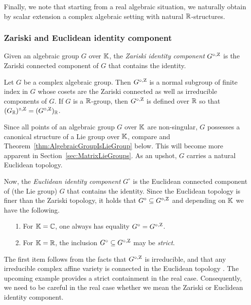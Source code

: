 
Finally, we note that starting from a real algebraic situation, we naturally obtain by scalar extension a complex algebraic setting with natural $\mathbb R$-structures. 



\subsubsection{Zariski and Euclidean identity component}


Given an algebraic group $G$ over $\mathbb K$, the \emph{Zariski identity component} $G^{\circ, \operatorname{Z}}$ is the Zariski connected component of $G$ that contains the identity. 

\begin{prop}
	Let $G$ be a complex algebraic group. Then $G^{\circ, \operatorname{Z}}$ is a normal subgroup of finite index in $G$ whose cosets are the Zariski connected as well as irreducible components of $G$.
	If $G$ is a $\mathbb R$-group, then $G^{\circ, \operatorname{Z}}$ is defined over $\mathbb R$ so that $(G_{\mathbb R})^{\circ, \operatorname{Z}} = (G^{\circ,\operatorname{Z}})_\mathbb R$.
\end{prop}

Since all points of an algebraic group $G$ over $\mathbb K$ are non-singular, $G$ possesses a canonical structure of a Lie group over $\mathbb K$, compare \cite[Sections~3.1.2 and ~2.3.4]{OnishchikVinbergBook} and Theorem~\ref{thm:AlgebraicGroupIsLieGroup} below.
This will become more apparent in Section~\ref{sec:MatrixLieGroups}. As an upshot, $G$ carries a natural Euclidean topology. 

Now, the \emph{Euclidean identity component} $G^{\circ}$ is the Euclidean connected component of (the Lie group) $G$ that contains the identity. Since the Euclidean topology is finer than the Zariski topology, it holds that $G^{\circ} \subseteq G^{\circ, \operatorname{Z}}$ and depending on $\mathbb K$ we have the following.
	\begin{itemize}
		\item[1.] For $\mathbb K = \mathbb C$, one always has equality $G^{\circ} = G^{\circ, \operatorname{Z}}$.
		
		\item[2.] For $\mathbb K = \mathbb R$, the inclusion $G^{\circ} \subseteq G^{\circ, \operatorname{Z}}$ may be \emph{strict}.
	\end{itemize}
The first item follows from the facts that $G^{\circ, \operatorname{Z}}$ is irreducible, and that any irreducible complex affine variety is connected in the Euclidean topology \cite[Theorem~7.1]{ShafarevichBAG2}.
The upcoming example provides a strict containment in the real case. Consequently, we need to be careful in the real case whether we mean the Zariski or Euclidean identity component.

